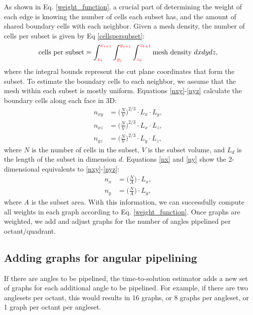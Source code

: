 As shown in Eq. \ref{weight_function}, a crucial part of determining the weight of each edge is knowing the number of cells each subset has, and the amount of shared boundary cells with each neighbor. Given a mesh density, the number of cells per subset is given by Eq \ref{cellspersubset}:
\begin{equation}
   \text{cells per subset} = \int_{\textcolor{red}{x_i}}^{\textcolor{red}{x_{i+1}}} \int_{\textcolor{red}{y_j}}^{\textcolor{red}{y_{j+1}}} \int_{\textcolor{red}{z_k}}^{\textcolor{red}{z_{k+1}}} \text{mesh density } dx dy dz,
\label{cellspersubset}
\end{equation}
where the integral bounds represent the cut plane coordinates that form the subset. To estimate the boundary cells to each neighbor, we assume that the mesh within each subset is mostly uniform. Equations \ref{nxy}-\ref{nyz} calculate the boundary cells along each face in 3D:
\begin{align}
n_{xy} &= \big(\frac{N}{V}\big)^{2/3}\cdot L_x\cdot L_y \label{nxy}, \\
n_{xz} &= \big(\frac{N}{V}\big)^{2/3}\cdot L_x\cdot L_z \label{nxz}, \\
n_{yz} &= \big(\frac{N}{V}\big)^{2/3}\cdot L_y\cdot L_z \label{nyz},
\end{align}
where $N$ is the number of cells in the subset, $V$ is the subset volume, and $L_d$ is the length of the subset in dimension $d$.
Equations \ref{nx} and \ref{ny} show the 2-dimensional equivalents to \ref{nxy}-\ref{nyz}:
\begin{align}
n_x &= \big(\frac{N}{A}\big)\cdot L_x, \label{nx} \\
n_y &= \big(\frac{N}{A}\big)\cdot L_y, \label{ny}
\end{align}
where $A$ is the subset area. With this information, we can successfully compute all weights in each graph according to Eq. \ref{weight_function}. Once graphs are weighted, we add and adjust graphs for the number of angles pipelined per octant/quadrant.

\subsection{Adding graphs for angular pipelining}

If there are angles to be pipelined, the time-to-solution estimator adds a new set of graphs for each additional angle to be pipelined. For example, if there are two anglesets per octant, this would results in 16 graphs, or 8 graphs per angleset, or 1 graph per octant per angleset.


